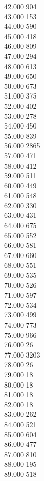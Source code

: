 { 42.000	904 \\
 43.000	153 \\
 44.000	590 \\
 45.000	418 \\
 46.000	809 \\
 47.000	294 \\
 48.000	613 \\
 49.000	650 \\
 50.000	673 \\
 51.000	375 \\
 52.000	402 \\
 53.000	278 \\
 54.000	450 \\
 55.000	839 \\
 56.000	2865 \\
 57.000	471 \\
 58.000	412 \\
 59.000	511 \\
 60.000	449 \\
 61.000	548 \\
 62.000	330 \\
 63.000	431 \\
 64.000	675 \\
 65.000	552 \\
 66.000	581 \\
 67.000	660 \\
 68.000	551 \\
 69.000	535 \\
 70.000	526 \\
 71.000	597 \\
 72.000	534 \\
 73.000	499 \\
 74.000	773 \\
 75.000	966 \\
 76.000	26 \\
 77.000	3203 \\
 78.000	26 \\
 79.000	18 \\
 80.000	18 \\
 81.000	18 \\
 82.000	18 \\
 83.000	262 \\
 84.000	521 \\
 85.000	604 \\
 86.000	477 \\
 87.000	810 \\
 88.000	195 \\
 89.000	518 \\
}
